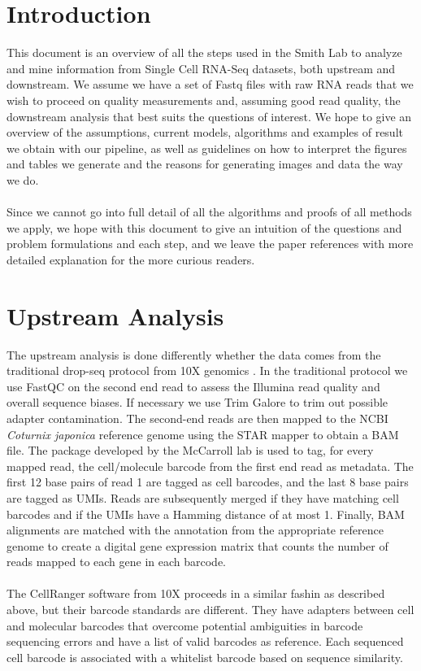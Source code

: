 \section{Introduction}
This document is an overview of all the steps used in the Smith Lab to analyze and mine information from Single Cell RNA-Seq datasets, both upstream and downstream. We assume we have a set of Fastq files with raw RNA reads that we wish to proceed on quality measurements and, assuming good read quality, the downstream analysis that best suits the questions of interest. We hope to give an overview of the assumptions, current models, algorithms and examples of result we obtain with our pipeline, as well as guidelines on how to interpret the figures and tables we generate and the reasons for generating images and data the way we do. \\
\\
Since we cannot go into full detail of all the algorithms and proofs of all methods we apply, we hope with this document to give an intuition of the questions and problem formulations and each step, and we leave the paper references with more detailed explanation for the more curious readers. 

\section{Upstream Analysis}
The upstream analysis is done differently whether the data comes from the traditional drop-seq protocol \cite{macosko2015highly} from 10X genomics \cite{zheng2016massively}. In the traditional protocol we use FastQC \cite{andrews2010fastqc} on the second end read to assess the Illumina read quality and overall sequence biases. If necessary we use Trim Galore \cite{krueger2015trim} to trim out possible adapter contamination. The second-end reads are then mapped to the NCBI \emph{Coturnix japonica} reference genome using the STAR\cite{dobin2013star} mapper to obtain a BAM file. The package developed by the McCarroll lab \cite{macosko2015highly} is used to tag, for every mapped read, the cell/molecule barcode from the first end read as metadata. The first 12 base pairs of read 1 are tagged as cell barcodes, and the last 8 base pairs are tagged as UMIs. Reads are subsequently merged if they have matching cell barcodes and if the UMIs have a Hamming distance of at most 1. Finally, BAM alignments are matched with the annotation from the appropriate reference genome to create a digital gene expression matrix that counts the number of reads mapped to each gene in each barcode. 
\\
\\
The CellRanger software from 10X proceeds in a similar fashin as described above, but their barcode standards are different. They have adapters between cell and molecular barcodes that overcome potential ambiguities in barcode sequencing errors and have a list of valid barcodes as reference. Each sequenced cell barcode is associated with a whitelist barcode based on sequence similarity. 

